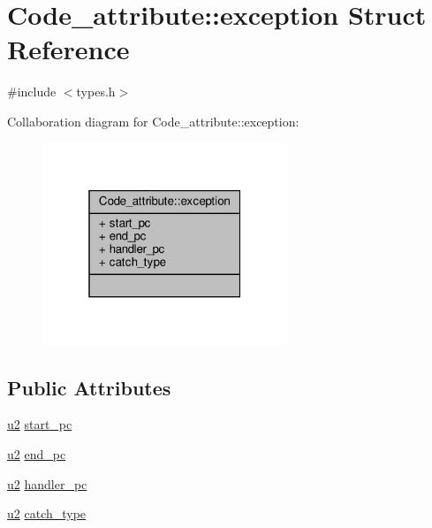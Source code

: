\hypertarget{structCode__attribute_1_1exception}{}\section{Code\+\_\+attribute\+:\+:exception Struct Reference}
\label{structCode__attribute_1_1exception}


{\ttfamily \#include $<$types.\+h$>$}



Collaboration diagram for Code\+\_\+attribute\+:\+:exception\+:\nopagebreak
\begin{figure}[H]
\begin{center}
\leavevmode
\includegraphics[width=208pt]{structCode__attribute_1_1exception__coll__graph}
\end{center}
\end{figure}
\subsection*{Public Attributes}
\begin{DoxyCompactItemize}
\item 
\hyperlink{types_8h_ae676e9207f57fb921dca7366b2f59c53}{u2} \hyperlink{structCode__attribute_1_1exception_a8625dbfff9f37b45282a6e8ca3665cfa}{start\+\_\+pc}
\item 
\hyperlink{types_8h_ae676e9207f57fb921dca7366b2f59c53}{u2} \hyperlink{structCode__attribute_1_1exception_a572504bb3e53ac2069cb5710bea59b68}{end\+\_\+pc}
\item 
\hyperlink{types_8h_ae676e9207f57fb921dca7366b2f59c53}{u2} \hyperlink{structCode__attribute_1_1exception_ac774677c0663b985f05d53d7146f44c4}{handler\+\_\+pc}
\item 
\hyperlink{types_8h_ae676e9207f57fb921dca7366b2f59c53}{u2} \hyperlink{structCode__attribute_1_1exception_a23ae7a3e05e2341fdfb9d2726089945e}{catch\+\_\+type}
\end{DoxyCompactItemize}



